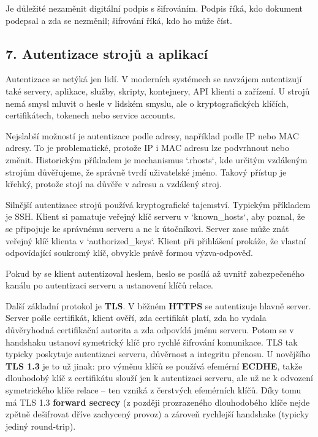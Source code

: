 \documentclass[11pt,a4paper]{article}
\begin{document}
Je důležité nezaměnit digitální podpis s šifrováním. Podpis říká, kdo dokument podepsal a zda se nezměnil; šifrování říká, kdo ho může číst.

\subsection*{7. Autentizace strojů a aplikací}

Autentizace se netýká jen lidí. V moderních systémech se navzájem autentizují také servery, aplikace, služby, skripty, kontejnery, API klienti a zařízení. U strojů nemá smysl mluvit o hesle v lidském smyslu, ale o kryptografických klíčích, certifikátech, tokenech nebo service accounts.

Nejslabší možností je autentizace podle adresy, například podle IP nebo MAC adresy. To je problematické, protože IP i MAC adresu lze podvrhnout nebo změnit. Historickým příkladem je mechanismus `.rhosts`, kde určitým vzdáleným strojům důvěřujeme, že správně tvrdí uživatelské jméno. Takový přístup je křehký, protože stojí na důvěře v adresu a vzdálený stroj.

Silnější autentizace strojů používá kryptografické tajemství. Typickým příkladem je SSH. Klient si pamatuje veřejný klíč serveru v `known\_hosts`, aby poznal, že se připojuje ke správnému serveru a ne k útočníkovi. Server zase může znát veřejný klíč klienta v `authorized\_keys`. Klient při přihlášení prokáže, že vlastní odpovídající soukromý klíč, obvykle právě formou výzva-odpověď.

Pokud by se klient autentizoval heslem, heslo se posílá až uvnitř zabezpečeného kanálu po autentizaci serveru a ustanovení klíčů relace.

Další základní protokol je \textbf{TLS}. V běžném \textbf{HTTPS} se autentizuje hlavně server. Server pošle certifikát, klient ověří, zda certifikát platí, zda ho vydala důvěryhodná certifikační autorita a zda odpovídá jménu serveru. Potom se v handshaku ustanoví symetrický klíč pro rychlé šifrování komunikace. TLS tak typicky poskytuje autentizaci serveru, důvěrnost a integritu přenosu. U novějšího \textbf{TLS 1.3} je to už jinak: pro výměnu klíčů se používá efemérní \textbf{ECDHE}, takže dlouhodobý klíč z certifikátu slouží jen k autentizaci serveru, ale už ne k odvození symetrického klíče relace -- ten vzniká z čerstvých efemérních klíčů. Díky tomu má TLS 1.3 \textbf{forward secrecy} (z později prozrazeného dlouhodobého klíče nejde zpětně dešifrovat dříve zachycený provoz) a zároveň rychlejší handshake (typicky jediný round-trip).
\end{document}
